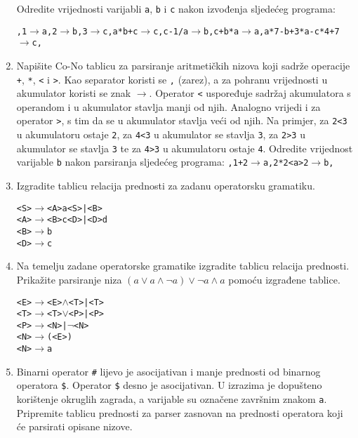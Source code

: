 \documentclass[times, 12pt, utf8]{book}
\begin{document}
\begin{enumerate}[resume]
Odredite vrijednosti varijabli \texttt{a}, \texttt{b} i \texttt{c} nakon izvođenja sljedećeg programa:

\texttt{,1\(\to\)a,2\(\to\)b,3\(\to\)c,a*b+c\(\to\)c,c-1/a\(\to\)b,c+b*a\(\to\)a,a*7-b+3*a-c*4+7\(\to\)c,} \cite[str.~83-84]{udzbenik} \cite{auditorne}

\item
Napišite Co-No tablicu za parsiranje aritmetičkih nizova koji sadrže operacije \texttt{+}, \texttt{*}, \texttt{<} i \texttt{>}.
Kao separator koristi se \texttt{,} (zarez), a za pohranu vrijednosti u akumulator koristi se znak \texttt{\(\to\)}.
Operator \texttt{<} uspoređuje sadržaj akumulatora s operandom i u akumulator stavlja manji od njih.
Analogno vrijedi i za operator \texttt{>}, s tim da se u akumulator stavlja veći od njih.
Na primjer, za \texttt{2<3} u akumulatoru ostaje \texttt{2}, za \texttt{4<3} u akumulator se stavlja \texttt{3}, za \texttt{2>3} u akumulator se stavlja \texttt{3} te za \texttt{4>3} u akumulatoru ostaje \texttt{4}.
Odredite vrijednost varijable \texttt{b} nakon parsiranja sljedećeg programa: \texttt{,1+2\(\to\)a,2*2<a>2\(\to\)b,}  \cite[str.~83-84]{udzbenik} \cite{auditorne}

\item
Izgradite tablicu relacija prednosti za zadanu operatorsku gramatiku. \cite[str.~133-135]{udzbenik}

\begin{alltt}
<S> \(\to\) <A>a<S> | <B>
<A> \(\to\) <B>c<D> | <D>d
<B> \(\to\) b
<D> \(\to\) c
\end{alltt} 

\item
Na temelju zadane operatorske gramatike izgradite tablicu relacija prednosti. Prikažite parsiranje niza \( (a \vee a \wedge \lnot a) \vee \lnot a \wedge a \) pomoću izgrađene tablice. \cite[str.~133-135]{udzbenik}

\begin{alltt}
<E> \(\to\) <E> \(\wedge\) <T> | <T>
<T> \(\to\) <T> \(\vee\) <P> | <P>
<P> \(\to\) <N> | \(\lnot\)<N>
<N> \(\to\) ( <E> )
<N> \(\to\) a
\end{alltt} 

\item
Binarni operator \texttt{\#} lijevo je asocijativan i manje prednosti od binarnog operatora \texttt{\$}.
Operator \texttt{\$} desno je asocijativan.
U izrazima je dopušteno korištenje okruglih zagrada, a varijable su označene završnim znakom \texttt{a}.
Pripremite tablicu prednosti za parser zasnovan na prednosti operatora koji će parsirati opisane nizove. \cite[str.~135-136]{udzbenik}


\end{enumerate}
\end{document}
